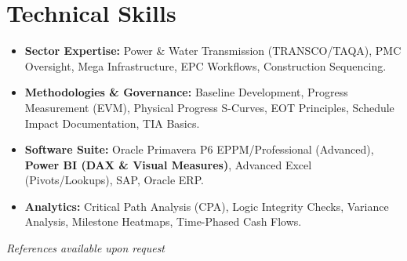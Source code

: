 \documentclass[11pt,a4paper]{article}
\begin{document}
\section{Technical Skills}
\begin{itemize}[label={\color{awesome-blue}\small\textbullet}, leftmargin=*, itemsep=0pt, parsep=0pt]
    \raggedright
    \item \textbf{Sector Expertise:} Power \& Water Transmission (TRANSCO/TAQA), PMC Oversight, Mega Infrastructure, EPC Workflows, Construction Sequencing.
    \item \textbf{Methodologies \& Governance:} Baseline Development, Progress Measurement (EVM), Physical Progress S-Curves, EOT Principles, Schedule Impact Documentation, TIA Basics.
    \item \textbf{Software Suite:} Oracle Primavera P6 EPPM/Professional (Advanced), \textbf{Power BI (DAX \& Visual Measures)}, Advanced Excel (Pivots/Lookups), SAP, Oracle ERP.
    \item \textbf{Analytics:} Critical Path Analysis (CPA), Logic Integrity Checks, Variance Analysis, Milestone Heatmaps, Time-Phased Cash Flows.
\end{itemize}

\vfill
\begin{center}
    \textit{References available upon request}
\end{center}
\end{document}
